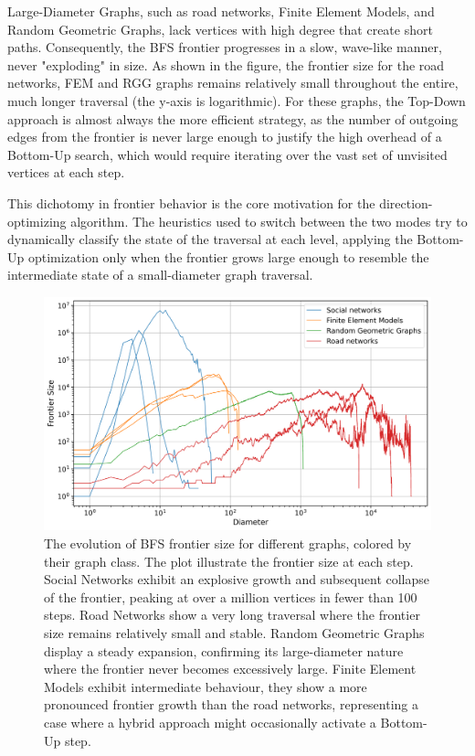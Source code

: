 Large-Diameter Graphs, such as road networks, Finite Element Models, and Random Geometric Graphs, lack vertices with high degree that create short paths. Consequently, the BFS frontier progresses in a slow, wave-like manner, never "exploding" in size. As shown in the figure, the frontier size for the road networks, FEM and RGG graphs remains relatively small throughout the entire, much longer traversal (the y-axis is logarithmic). For these graphs, the Top-Down approach is almost always the more efficient strategy, as the number of outgoing edges from the frontier is never large enough to justify the high overhead of a Bottom-Up search, which would require iterating over the vast set of unvisited vertices at each step.

This dichotomy in frontier behavior is the core motivation for the direction-optimizing algorithm. The heuristics used to switch between the two modes try to dynamically classify the state of the traversal at each level, applying the Bottom-Up optimization only when the frontier grows large enough to resemble the intermediate state of a small-diameter graph traversal.

\begin{figure}[h]
    \centering
    \includegraphics[width=0.8\linewidth]{images/frontiers_plot.png}
    \caption{The evolution of BFS frontier size for different graphs, colored by their graph class. The plot illustrate the frontier size at each step. Social Networks exhibit an explosive growth and subsequent collapse of the frontier, peaking at over a million vertices in fewer than 100 steps. Road Networks show a very long traversal where the frontier size remains relatively small and stable. Random Geometric Graphs display a steady expansion, confirming its large-diameter nature where the frontier never becomes excessively large. Finite Element Models exhibit intermediate behaviour, they show a more pronounced frontier growth than the road networks, representing a case where a hybrid approach might occasionally activate a Bottom-Up step.}
    \label{fig:frontiersize}
\end{figure}

